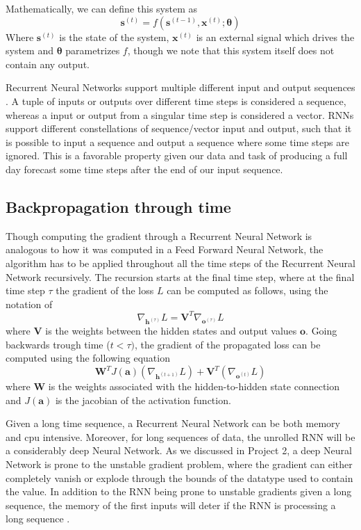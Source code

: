 \documentclass
[twocolumn,
secnumarabic,
nobibnotes,
aps,
prl,
reprint,
groupedaddress,
amsmath,
amssymb,
]{revtex4-2}
\begin{document}
Mathematically, we can define this system as
\begin{equation}
  \nonumber
  \bm{s}^{(t)} = f(\bm{s}^{(t-1)},\bm{x}^{(t)};\bm{\theta})
\end{equation}
Where $\bm{s}^{(t)}$ is the state of the system, $\bm{x}^{(t)}$ is an external signal which drives the system and $\bm{\theta}$ parametrizes $f$, though we note that this system itself does not contain any output. 

Recurrent Neural Networks support multiple different input and output sequences \cite{Geron2019}. A tuple of inputs or outputs over different time steps is considered a sequence, whereas a input or output from a singular time step is considered a vector. RNNs support different constellations of sequence/vector input and output, such that it is possible to input a sequence and output a sequence where some time steps are ignored. This is a favorable property given our data and task of producing a full day forecast some time steps after the end of our input sequence.

\subsection{Backpropagation through time}
Though computing the gradient through a Recurrent Neural Network is analogous to how it was computed in a Feed Forward Neural Network, the algorithm has to be applied throughout all the time steps of the Recurrent Neural Network recursively. The recursion starts at the final time step, where at the final time step $\tau$ the gradient of the loss $L$ can be computed as follows, using the notation of \cite{Goodfellow2016}
\begin{equation}
  \nabla_{\bm{h}^{(\tau)}}L = \bm{V}^T \nabla_{\bm{o}^{(\tau)}}L
\end{equation}
where $\bm{V}$ is the weights between the hidden states and output values $\bm{o}$.
Going backwards trough time ($t < \tau)$, the gradient of the propagated loss can be computed using the following equation
\begin{equation}
  \bm{W}^TJ(\bm{a})(\nabla_{\bm{h}^{(t+1)}}L)+\bm{V}^T(\nabla_{\bm{o}^{(t)}}L)
\end{equation}
where $\bm{W}$ is the weights associated with the hidden-to-hidden state connection and $J(\bm{a})$ is the jacobian of the activation function.%


Given a long time sequence, a Recurrent Neural Network can be both memory and cpu intensive. Moreover, for long sequences of data, the unrolled RNN will be a considerably deep Neural Network. As we discussed in Project 2, a deep Neural Network is prone to the unstable gradient problem, where the gradient can either completely vanish or explode through the bounds of the datatype used to contain the value. In addition to the RNN being prone to unstable gradients given a long sequence, the memory of the first inputs will deter if the RNN is processing a long sequence \cite{Geron2019}.
\end{document}
